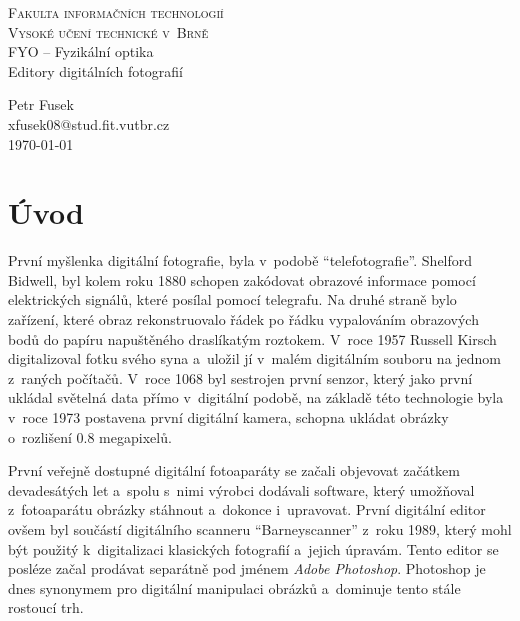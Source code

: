 \documentclass[11pt, a4paper, titlepage]{article}
\renewcommand{\uv}[1]{``#1''}
\begin{document}
\begin{titlepage}
    \begin{center}
        \textsc{\LARGE Fakulta informačních technologií}\\
        \vspace{0.1 cm}
        \textsc{\LARGE Vysoké učení technické v~Brně}\\
        {\Huge FYO -- Fyzikální optika}\\
        {\huge Editory digitálních fotografií}
    \end{center}
    \begin{center}
    \Large
    Petr Fusek \\
    xfusek08@stud.fit.vutbr.cz \\
    \today
    \end{center}
\end{titlepage}


\section{Úvod}
První myšlenka digitální fotografie, byla v~podobě \uv{telefotografie}.
Shelford Bidwell, byl kolem roku 1880 schopen zakódovat obrazové informace pomocí elektrických signálů, které posílal pomocí telegrafu.
Na druhé straně bylo zařízení, které obraz rekonstruovalo řádek po řádku vypalováním obrazových bodů do papíru napuštěného draslíkatým roztokem.
V~roce 1957 Russell Kirsch digitalizoval fotku svého syna a~uložil jí v~malém digitálním souboru na jednom z~raných počítačů.
V~roce 1068 byl sestrojen první senzor, který jako první ukládal světelná data přímo v~digitální podobě, na základě této technologie byla v~roce 1973 postavena první digitální kamera, schopna ukládat obrázky o~rozlišení 0.8 megapixelů.
\cite{first_digital_photography}
 
První veřejně dostupné digitální fotoaparáty se začali objevovat začátkem devadesátých let a~spolu s~nimi výrobci dodávali software, který umožňoval z~fotoaparátu obrázky stáhnout a~dokonce i~upravovat.
První digitální editor ovšem byl součástí digitálního scanneru \uv{Barneyscanner} z~roku 1989, který mohl být použitý k~digitalizaci klasických fotografií a~jejich úpravám.
Tento editor se posléze začal prodávat separátně pod jménem \emph{Adobe Photoshop}.
Photoshop je dnes synonymem pro digitální manipulaci obrázků a~dominuje tento stále rostoucí trh. \cite{digital_editing_histroy}
\end{document}
